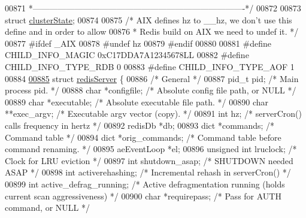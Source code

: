 \begin{DoxyCode}
{{{{{{00871 \textcolor{comment}{ *----------------------------------------------------------------------------*/}
00872 
00873 \textcolor{keyword}{struct} \hyperlink{structclusterState}{clusterState};
00874 
00875 \textcolor{comment}{/* AIX defines hz to \_\_hz, we don't use this define and in order to allow}
00876 \textcolor{comment}{ * Redis build on AIX we need to undef it. */}
00877 \textcolor{preprocessor}{#}\textcolor{preprocessor}{ifdef} \textcolor{preprocessor}{\_AIX}
00878 \textcolor{preprocessor}{#}\textcolor{preprocessor}{undef} \textcolor{preprocessor}{hz}
00879 \textcolor{preprocessor}{#}\textcolor{preprocessor}{endif}
00880 
00881 \textcolor{preprocessor}{#}\textcolor{preprocessor}{define} \textcolor{preprocessor}{CHILD\_INFO\_MAGIC} 0xC17DDA7A12345678LL
00882 \textcolor{preprocessor}{#}\textcolor{preprocessor}{define} \textcolor{preprocessor}{CHILD\_INFO\_TYPE\_RDB} 0
00883 \textcolor{preprocessor}{#}\textcolor{preprocessor}{define} \textcolor{preprocessor}{CHILD\_INFO\_TYPE\_AOF} 1
00884 
\hyperlink{structredisServer}{00885} \textcolor{keyword}{struct} \hyperlink{structredisServer}{redisServer} \{
00886     \textcolor{comment}{/* General */}
00887     pid\_t pid;                  \textcolor{comment}{/* Main process pid. */}
00888     \textcolor{keywordtype}{char} *configfile;           \textcolor{comment}{/* Absolute config file path, or NULL */}
00889     \textcolor{keywordtype}{char} *executable;           \textcolor{comment}{/* Absolute executable file path. */}
00890     \textcolor{keywordtype}{char} **exec\_argv;           \textcolor{comment}{/* Executable argv vector (copy). */}
00891     \textcolor{keywordtype}{int} hz;                     \textcolor{comment}{/* serverCron() calls frequency in hertz */}
00892     redisDb *db;
00893     dict *commands;             \textcolor{comment}{/* Command table */}
00894     dict *orig\_commands;        \textcolor{comment}{/* Command table before command renaming. */}
00895     aeEventLoop *el;
00896     \textcolor{keywordtype}{unsigned} \textcolor{keywordtype}{int} lruclock;      \textcolor{comment}{/* Clock for LRU eviction */}
00897     \textcolor{keywordtype}{int} shutdown\_asap;          \textcolor{comment}{/* SHUTDOWN needed ASAP */}
00898     \textcolor{keywordtype}{int} activerehashing;        \textcolor{comment}{/* Incremental rehash in serverCron() */}
00899     \textcolor{keywordtype}{int} active\_defrag\_running;  \textcolor{comment}{/* Active defragmentation running (holds current scan aggressiveness)
       */}
00900     \textcolor{keywordtype}{char} *requirepass;          \textcolor{comment}{/* Pass for AUTH command, or NULL */}
}}}}}}
\end{DoxyCode}
